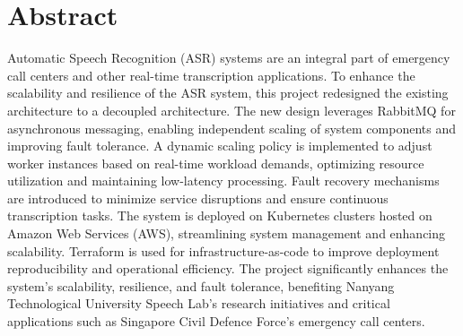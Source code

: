 \chapter*{Abstract}

Automatic Speech Recognition (ASR) systems are an integral part of emergency call centers and other real-time transcription applications. To enhance the scalability and resilience of the ASR system, this project redesigned the existing architecture to a decoupled architecture. The new design leverages RabbitMQ for asynchronous messaging, enabling independent scaling of system components and improving fault tolerance. A dynamic scaling policy is implemented to adjust worker instances based on real-time workload demands, optimizing resource utilization and maintaining low-latency processing. Fault recovery mechanisms are introduced to minimize service disruptions and ensure continuous transcription tasks. The system is deployed on Kubernetes clusters hosted on Amazon Web Services (AWS), streamlining system management and enhancing scalability. Terraform is used for infrastructure-as-code to improve deployment reproducibility and operational efficiency. The project significantly enhances the system's scalability, resilience, and fault tolerance, benefiting Nanyang Technological University Speech Lab's research initiatives and critical applications such as Singapore Civil Defence Force's emergency call centers.
